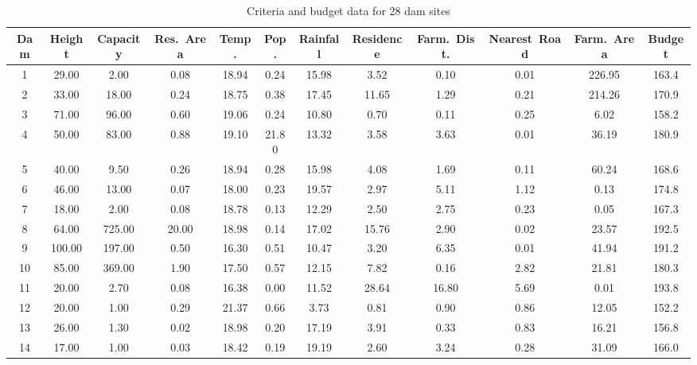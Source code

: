 \begin{landscape}
\begin{table}[htbp]
\centering
\caption{Criteria and budget data for 28 dam sites}
\label{tab:damData}
\begin{tabular}{c
                S[table-format=3.2]
                S[table-format=3.2]
                S[table-format=2.2]
                S[table-format=2.2]
                S[table-format=2.2]
                S[table-format=2.2]
                S[table-format=2.2]
                S[table-format=2.2]
                S[table-format=2.2]
                S[table-format=3.2]
                S[table-format=3.1]}
\toprule
Dam & {Height} & {Capacity} & {Res.~Area} & {Temp.} & {Pop.} & {Rainfall} & {Residence} & {Farm.~Dist.} & {Nearest~Road} & {Farm.~Area} & {Budget} \\
  & 29.00 & 2.00   & 0.08 & 18.94 & 0.24 & 15.98 & 3.52 & 0.10 & 0.01 & 226.95 & 163.4 \\
2  & 33.00 & 18.00  & 0.24 & 18.75 & 0.38 & 17.45 & 11.65& 1.29 & 0.21 & 214.26 & 170.9 \\
3  & 71.00 & 96.00  & 0.60 & 19.06 & 0.24 & 10.80 & 0.70 & 0.11 & 0.25 & 6.02   & 158.2 \\
4  & 50.00 & 83.00  & 0.88 & 19.10 & 21.80& 13.32 & 3.58 & 3.63 & 0.01 & 36.19  & 180.9 \\
5  & 40.00 & 9.50   & 0.26 & 18.94 & 0.28 & 15.98 & 4.08 & 1.69 & 0.11 & 60.24  & 168.6 \\
6  & 46.00 & 13.00  & 0.07 & 18.00 & 0.23 & 19.57 & 2.97 & 5.11 & 1.12 & 0.13   & 174.8 \\
7  & 18.00 & 2.00   & 0.08 & 18.78 & 0.13 & 12.29 & 2.50 & 2.75 & 0.23 & 0.05   & 167.3 \\
8  & 64.00 & 725.00 & 20.00& 18.98 & 0.14 & 17.02 & 15.76& 2.90 & 0.02 & 23.57  & 192.5 \\
9  & 100.00& 197.00 & 0.50 & 16.30 & 0.51 & 10.47 & 3.20 & 6.35 & 0.01 & 41.94  & 191.2 \\
10 & 85.00 & 369.00 & 1.90 & 17.50 & 0.57 & 12.15 & 7.82 & 0.16 & 2.82 & 21.81  & 180.3 \\
11 & 20.00 & 2.70   & 0.08 & 16.38 & 0.00 & 11.52 & 28.64& 16.80& 5.69 & 0.01   & 193.8 \\
12 & 20.00 & 1.00   & 0.29 & 21.37 & 0.66 & 3.73  & 0.81 & 0.90 & 0.86 & 12.05  & 152.2 \\
13 & 26.00 & 1.30   & 0.02 & 18.98 & 0.20 & 17.19 & 3.91 & 0.33 & 0.83 & 16.21  & 156.8 \\
14 & 17.00 & 1.00   & 0.03 & 18.42 & 0.19 & 19.19 & 2.60 & 3.24 & 0.28 & 31.09  & 166.0 \\

\end{tabular}
\end{table}
\end{landscape}
